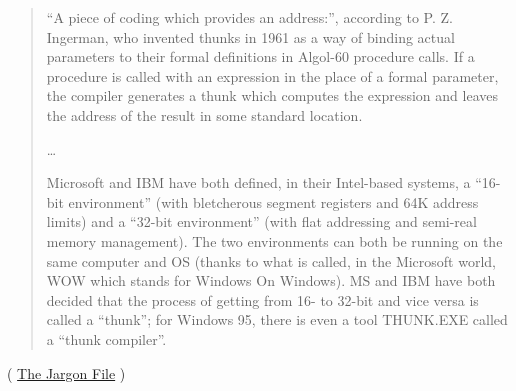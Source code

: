 

\begin{framed}
\begin{quotation}
“A piece of coding which provides an address:”, according to P. Z. Ingerman, 
who invented thunks in 1961 as a way of binding actual parameters to their formal 
definitions in Algol-60 procedure calls. If a procedure is called with an expression 
in the place of a formal parameter, the compiler generates a thunk which computes 
the expression and leaves the address of the result in some standard location.

\dots

Microsoft and IBM have both defined, in their Intel-based systems, a “16-bit environment” 
(with bletcherous segment registers and 64K address limits) and a “32-bit environment” 
(with flat addressing and semi-real memory management). The two environments can both be 
running on the same computer and OS (thanks to what is called, in the Microsoft world, 
WOW which stands for Windows On Windows). MS and IBM have both decided that the process 
of getting from 16- to 32-bit and vice versa is called a “thunk”; for Windows 95, 
there is even a tool THUNK.EXE called a “thunk compiler”.
\end{quotation}
\end{framed}
( \href{http://go.yurichev.com/17362}{The Jargon File} )

